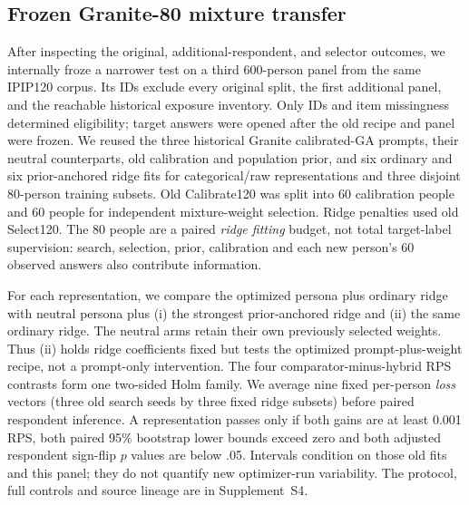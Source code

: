 \documentclass[10pt,twocolumn]{article}
\newcommand{\ArchivalApp}{Supplement~S4}
\begin{document}
\subsection{Frozen Granite-80 mixture transfer}
After inspecting the original, additional-respondent, and selector outcomes,
we internally froze a narrower test on a third 600-person panel from the same
IPIP120 corpus. Its IDs exclude every original split, the first additional
panel, and the reachable historical exposure inventory. Only IDs and item
missingness determined eligibility; target answers were opened after the old
recipe and panel were frozen. We reused the three historical Granite
calibrated-GA prompts, their neutral counterparts, old calibration and
population prior, and six ordinary and six prior-anchored ridge fits for
categorical/raw representations and three disjoint 80-person training
subsets. Old Calibrate120 was split into 60 calibration people and 60 people
for independent mixture-weight selection. Ridge penalties used old Select120.
The 80 people are a paired \emph{ridge fitting} budget, not total target-label
supervision: search, selection, prior, calibration and each new person's 60
observed answers also contribute information.

For each representation, we compare the optimized persona plus ordinary ridge with neutral persona plus (i) the strongest prior-anchored ridge and
(ii) the same ordinary ridge. The neutral arms retain their own previously
selected weights. Thus (ii) holds ridge coefficients fixed but tests the
optimized prompt-plus-weight recipe, not a prompt-only intervention. The four
comparator-minus-hybrid RPS contrasts form one two-sided Holm family. We
average nine fixed per-person \emph{loss} vectors (three old search seeds by
three fixed ridge subsets) before paired respondent inference. A
representation passes only if both gains are at least 0.001 RPS, both paired
95\% bootstrap lower bounds exceed zero and both adjusted respondent
sign-flip $p$ values are below .05. Intervals condition on those old fits and
this panel; they do not quantify new optimizer-run variability. The protocol,
full controls and source lineage are in \ArchivalApp.
\end{document}
